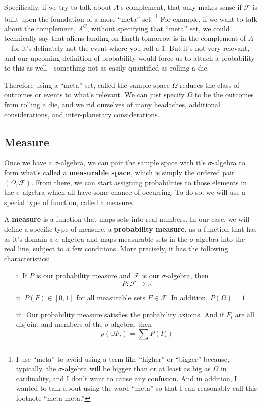 \documentclass[12pt]{article}
\theoremstyle{plain}
\theoremstyle{definition}
\theoremstyle{remark}
\begin{document}
Specifically, if we try to talk about $A$'s complement, that only
makes sense if $\mathcal{F}$ is built upon the foundation of a
more ``meta'' set. \footnote{I use ``meta'' to avoid using a term
like ``higher'' or ``bigger'' because, typically, the $\sigma$-algebra
will be bigger than or at least as big as $\Omega$ in cardinality,
and I don't want to cause any confusion. And
in addition, I wanted to talk about using the word ``meta'' so that
I can reasonably call this footnote ``meta-meta.''}
For example, if we want to talk about
the complement, $A^C$, without specifying that ``meta'' set, we could
technically say that aliens landing on Earth tomorrow is in the
complement of $A$---for it's definately not the event where you
roll a 1. But it's not very relevant, and our upcoming definition of
probability would force us to attach a probability to this as
well---something not as easily quantified as rolling a die.

Therefore using a ``meta'' set, called the sample space $\Omega$
reduces the class of outcomes or events to what's relevant. We can
just specify $\Omega$ to be the outcomes from rolling a die, and we
rid ourselves of many headaches, additional considerations, and
inter-planetary considerations.

\subsection{Measure}

Once we have a $\sigma$-algebra, we can pair the sample space with it's
$\sigma$-algebra to form what's called a
\textbf{measurable space}, which is simply the ordered pair
$(\Omega, \mathcal{F})$.  From there, we can start assigning
probabilities to those elements in the $\sigma$-algebra which all have
some chance of occurring.  To do so, we will use a special
type of function, called a measure.

A \textbf{measure} is a function that maps sets into real numbers.
In our case, we will define a specific type of measure, a
\textbf{probability measure}, as a
function that has as it's domain a $\sigma$-algebra and maps measurable
sets in the $\sigma$-algebra into the
real line, subject to a few conditions. More precisely, it has the
following characteristics:
\begin{itemize}
   \item[i.] If $P$ is our probability measure and $\mathcal{F}$ is
      our $\sigma$-algebra, then
	 \[ P: \mathcal{F} \rightarrow \mathbb{R} \]
   \item[ii.] $ P(F) \in [0,1]$ for all measurable sets
      $F \in \mathcal{F}$. In addition, $P(\Omega) =1$.
   \item[iii.] Our probability measure satisfies the probability axioms.
      And if $F_i$ are all disjoint and members of the $\sigma$-algebra,
      then
	 \[ p( \cup F_i) = \sum P(F_i) \]
\end{itemize}
\end{document}

